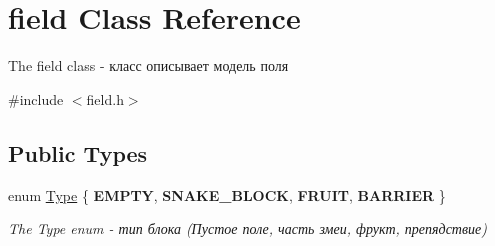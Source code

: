 \hypertarget{classfield}{}\section{field Class Reference}
\label{classfield}


The field class -\/ класс описывает модель поля  




{\ttfamily \#include $<$field.\+h$>$}

\subsection*{Public Types}
\begin{DoxyCompactItemize}
\item 
\hypertarget{classfield_a4910f59c849d43bf598b42fc47c91fba}{}enum \hyperlink{classfield_a4910f59c849d43bf598b42fc47c91fba}{Type} \{ {\bfseries E\+M\+P\+T\+Y}, 
{\bfseries S\+N\+A\+K\+E\+\_\+\+B\+L\+O\+C\+K}, 
{\bfseries F\+R\+U\+I\+T}, 
{\bfseries B\+A\+R\+R\+I\+E\+R}
 \}\label{classfield_a4910f59c849d43bf598b42fc47c91fba}

\begin{DoxyCompactList}\small\item\em The Type enum -\/ тип блока (Пустое поле, часть змеи, фрукт, препядствие) \end{DoxyCompactList}\end{DoxyCompactItemize}
